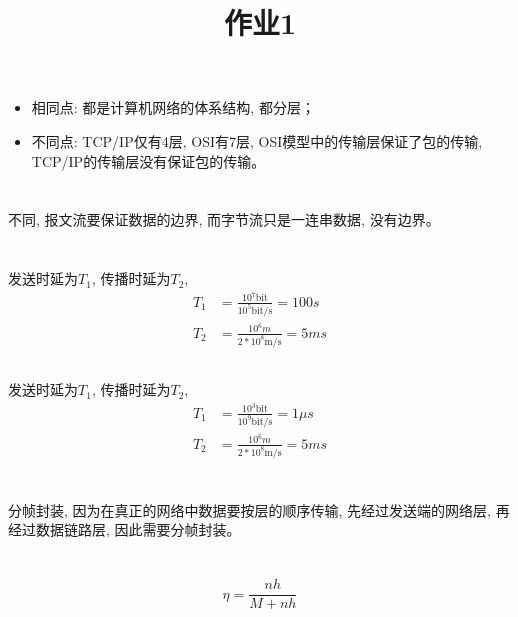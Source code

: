 \documentclass{zpt}
\title{作业1}
\begin{document}
\maketitle
\section{}
\begin{itemize}
    \item 相同点: 都是计算机网络的体系结构, 都分层；
    \item 不同点: TCP/IP仅有4层, OSI有7层, OSI模型中的传输层保证了包的传输, TCP/IP的传输层没有保证包的传输。
\end{itemize}

\section{}
不同, 报文流要保证数据的边界, 而字节流只是一连串数据, 没有边界。

\section{}
\subsection{}
发送时延为$T_1$, 传播时延为$T_2$, \begin{align}
    T_1 &= \frac{10^7\mathrm{bit}}{10^5\mathrm{bit/s}} = 100s\\
    T_2 &= \frac{10^6 m}{2*10^8\mathrm{m/s}} = 5ms
\end{align}
\subsection{}
发送时延为$T_1$, 传播时延为$T_2$, \begin{align}
    T_1 &= \frac{10^3\mathrm{bit}}{10^9\mathrm{bit/s}} = 1\mu s\\
    T_2 &= \frac{10^6 m}{2*10^8\mathrm{m/s}} = 5ms
\end{align}

\section{}
分帧封装, 因为在真正的网络中数据要按层的顺序传输, 先经过发送端的网络层, 再经过数据链路层, 因此需要分帧封装。

\section{}
\begin{equation}
    \eta = \frac{nh}{M + nh}
\end{equation}
\end{document}

